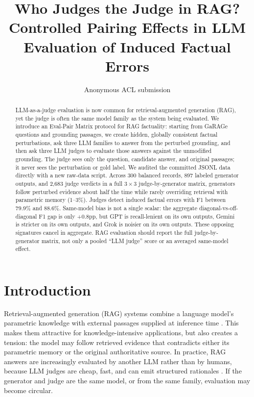 \documentclass[11pt]{article}
\title{Who Judges the Judge in RAG?\\ Controlled Pairing Effects in LLM Evaluation of Induced Factual Errors}
\author{Anonymous ACL submission}
\newcommand{\method}{Eval-Pair Matrix\xspace}
\newcommand{\pp}{\ensuremath{\mathrm{pp}}\xspace}
\begin{document}
\maketitle

\begin{abstract}
LLM-as-a-judge evaluation is now common for retrieval-augmented generation (RAG), yet the judge is often the same model family as the system being evaluated. We introduce an \method protocol for RAG factuality: starting from GaRAGe questions and grounding passages, we create hidden, globally consistent factual perturbations, ask three LLM families to answer from the perturbed grounding, and then ask three LLM judges to evaluate those answers against the unmodified grounding. The judge sees only the question, candidate answer, and original passages; it never sees the perturbation or gold label. We audited the committed JSONL data directly with a new raw-data script. Across 300 balanced records, 897 labeled generator outputs, and 2,683 judge verdicts in a full $3\times3$ judge-by-generator matrix, generators follow perturbed evidence about half the time while rarely overriding retrieval with parametric memory (1--3\%). Judges detect induced factual errors with F1 between 79.9\% and 88.6\%. Same-model bias is not a single scalar: the aggregate diagonal-vs-off-diagonal F1 gap is only +0.8\pp, but GPT is recall-lenient on its own outputs, Gemini is stricter on its own outputs, and Grok is noisier on its own outputs. These opposing signatures cancel in aggregate. RAG evaluation should report the full judge-by-generator matrix, not only a pooled ``LLM judge'' score or an averaged same-model effect.
\end{abstract}

\section{Introduction}

Retrieval-augmented generation (RAG) systems combine a language model's parametric knowledge with external passages supplied at inference time \citep{lewis2020rag}. This makes them attractive for knowledge-intensive applications, but also creates a tension: the model may follow retrieved evidence that contradicts either its parametric memory or the original authoritative source. In practice, RAG answers are increasingly evaluated by another LLM rather than by humans, because LLM judges are cheap, fast, and can emit structured rationales \citep{liu2023geval,zheng2023judging,kim2023prometheus}. If the generator and judge are the same model, or from the same family, evaluation may become circular.
\end{document}
